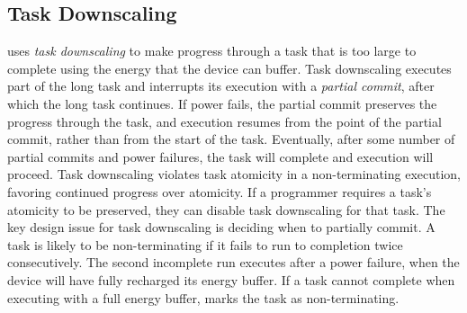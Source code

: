 
\subsection{Task Downscaling}
\label{sec:task_downsizing}

\sys uses {\em task downscaling} to make progress through a task that is too large to complete using the energy that the device can buffer. Task downscaling executes part of the long task and interrupts its execution with a {\em partial commit}, after which the long task continues. If power fails, the partial commit preserves the progress through the task, and execution resumes from the point of the partial commit, rather than from the start of the task. Eventually, after some number of partial commits and power failures, the task will complete and execution will proceed. Task downscaling violates task atomicity in a non-terminating execution, favoring continued progress over atomicity. If a programmer requires a task's atomicity to be preserved, they can disable task downscaling for that task. The key design issue for task downscaling is deciding when to partially commit. A task is likely to be non-terminating if it fails to run to completion twice consecutively. The second incomplete run executes after a power failure, when the device will have fully recharged its energy buffer. If a task cannot complete when executing with a full energy buffer, \sys marks the task as non-terminating.

